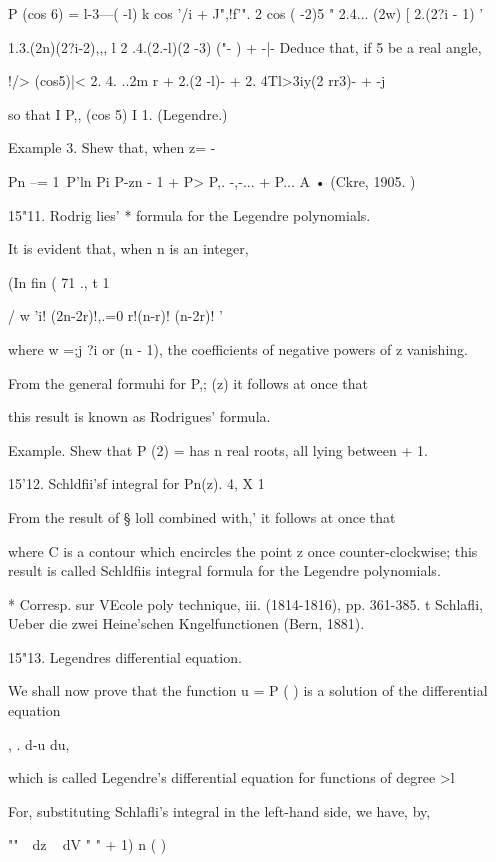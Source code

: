 P (cos 6) = l-3---( -l) k cos '/i + J",!f'". 2 cos ( -2)5 " 2.4...
(2w) [ 2.(2?i - 1) '

1.3.(2n)(2?i-2),,, l 2 .4.(2.-l)(2 -3) ("- ) + -|- Deduce that, if 5
be a real angle,

!/> (cos5)|< 2. 4. ..2m r + 2.(2 -l)- + 2. 4Tl>3iy(2 rr3)- + -j

so that I P,, (cos 5) I 1. (Legendre.)

Example 3. Shew that, when z= -\,

Pn --= 1\ P'ln Pi P-zn - 1 + P> P,. -,-... + P... A • (Ckre, 1905. )

15"11. Rodrig lies' * formula for the Legendre polynomials.

It is evident that, when n is an integer,

(In fin ( 71 ., t 1

  / w 'i! (2n-2r)!,.=0 r!(n-r)! (n-2r)! '

where w =;j ?i or (n - 1), the coefficients of negative powers of z
vanishing.

From the general formuhi for P,; (z) it follows at once that

this result is known as Rodrigues' formula.

Example. Shew that P (2) = has n real roots, all lying between + 1.

15'12. Schldfii'sf integral for Pn(z). 4, X 1

From the result of § loll combined with,' it follows at once
that

where C is a contour which encircles the point z once
counter-clockwise; this result is called Schldfiis integral formula
for the Legendre polynomials.

* Corresp. sur VEcole poly technique, iii. (1814-1816), pp. 361-385. t
Schlafli, Ueber die zwei Heine'schen Kngelfunctionen (Bern, 1881).

%
%

15"13. Legendres differential equation.

We shall now prove that the function u = P ( ) is a solution of the
differential equation

, . d-u du,

which is called Legendre's differential equation for functions of
degree >l

For, substituting Schlafli's integral in the left-hand side, we have,
by,

  ""~~dz ~ dV " " + 1) n ( )

